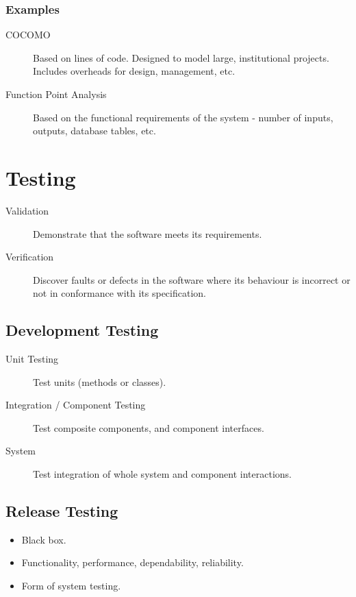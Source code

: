 \documentclass[landscape]{cheat}
\begin{document}
\begin{multicols}{3}
\subsubsection{Examples}
\begin{description}
    \item[COCOMO] Based on lines of code. Designed to model large, institutional projects. Includes overheads for design, management, etc.
    \item[Function Point Analysis] Based on the functional requirements of the system - number of inputs, outputs, database tables, etc.
\end{description}

\section{Testing}
\begin{description}
    \item[Validation] Demonstrate that the software meets its requirements.
    \item[Verification] Discover faults or defects in the software where its behaviour is incorrect or not in conformance with its specification.
\end{description}

\subsection{Development Testing}
\begin{description}
    \item[Unit Testing] Test units (methods or classes).
    \item[Integration / Component Testing] Test composite components, and component interfaces.
    \item[System] Test integration of whole system and component interactions.
\end{description}

\subsection{Release Testing}
\begin{itemize}
    \item Black box.
    \item Functionality, performance, dependability, reliability.
    \item Form of system testing.
\end{itemize}


\end{multicols}
\end{document}
